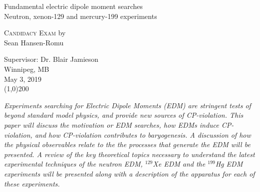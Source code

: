 

	\begin{center}
		{\LARGE Fundamental electric dipole moment searches \\\large Neutron, xenon-129 and mercury-199 experiments} %
		
		

		\vspace*{0.5cm}
			\textsc{
		Candidacy Exam }
		by \\
		\vspace*{0.5cm}
		\large Sean Hansen-Romu\\
		\vspace*{0.3cm}
		
	    \textnormal{
		Supervisor: Dr. Blair Jamieson\\
		\vspace*{0.3cm}
		Winnipeg, MB\\
		May 3, 2019}\\
	
		
		\vspace{1cm}
		\line(1,0){200} \\	
		\vspace*{1cm}
		
		 
          
		
\end{center}
\textnormal{\textit{ 
Experiments searching for Electric Dipole Moments (EDM) are stringent tests of beyond standard model physics, and provide new sources of CP-violation. This paper will discuss the motivation or EDM searches, how EDMs induce CP-violation, and how CP-violation contributes to baryogenesis. A discussion of how the physical observables relate to the the processes that generate the EDM will be presented. A review of the key theoretical topics necessary to understand the latest experimental techniques of the neutron EDM, $^{129}$Xe EDM and the $^{199}$Hg EDM experiments will be presented along with a description of the apparatus for each of these experiments.  
}}
\thispagestyle{empty}